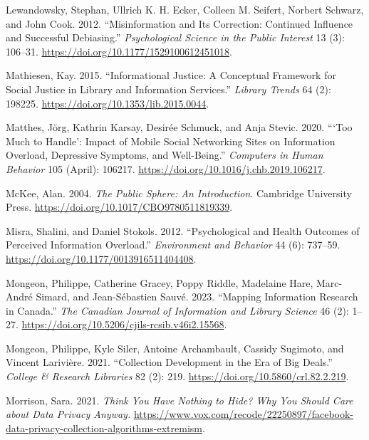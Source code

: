 \documentclass[
  letterpaper,
  DIV=11,
  numbers=noendperiod]{scrreprt}
\newlength{\cslhangindent}
\newenvironment{CSLReferences}[2] %
 {\begin{list}{}{%
  \setlength{\itemindent}{0pt}
  \setlength{\leftmargin}{0pt}
  \setlength{\parsep}{0pt}
  \ifodd #1
   \setlength{\leftmargin}{\cslhangindent}
   \setlength{\itemindent}{-1\cslhangindent}
  \fi
  \setlength{\itemsep}{#2\baselineskip}}}
 {\end{list}}
\begin{document}
\begin{CSLReferences}{1}{1}
Lewandowsky, Stephan, Ullrich K. H. Ecker, Colleen M. Seifert, Norbert
Schwarz, and John Cook. 2012. {``Misinformation and {Its} {Correction}:
{Continued} {Influence} and {Successful} {Debiasing}.''}
\emph{Psychological Science in the Public Interest} 13 (3): 106--31.
\url{https://doi.org/10.1177/1529100612451018}.

Mathiesen, Kay. 2015. {``Informational Justice: A Conceptual Framework
for Social Justice in Library and Information Services.''} \emph{Library
Trends} 64 (2): 198225. \url{https://doi.org/10.1353/lib.2015.0044}.

Matthes, Jörg, Kathrin Karsay, Desirée Schmuck, and Anja Stevic. 2020.
{``{`{Too} Much to Handle'}: {Impact} of Mobile Social Networking Sites
on Information Overload, Depressive Symptoms, and Well-Being.''}
\emph{Computers in Human Behavior} 105 (April): 106217.
\url{https://doi.org/10.1016/j.chb.2019.106217}.

McKee, Alan. 2004. \emph{The Public Sphere: An Introduction}. Cambridge
University Press. \url{https://doi.org/10.1017/CBO9780511819339}.

Misra, Shalini, and Daniel Stokols. 2012. {``Psychological and {Health}
{Outcomes} of {Perceived} {Information} {Overload}.''} \emph{Environment
and Behavior} 44 (6): 737--59.
\url{https://doi.org/10.1177/0013916511404408}.

Mongeon, Philippe, Catherine Gracey, Poppy Riddle, Madelaine Hare,
Marc-André Simard, and Jean-Sébastien Sauvé. 2023. {``Mapping
Information Research in Canada.''} \emph{The Canadian Journal of
Information and Library Science} 46 (2): 1--27.
\url{https://doi.org/10.5206/cjils-rcsib.v46i2.15568}.

Mongeon, Philippe, Kyle Siler, Antoine Archambault, Cassidy Sugimoto,
and Vincent Larivière. 2021. {``Collection Development in the Era of Big
Deals.''} \emph{College \& Research Libraries} 82 (2): 219.
\url{https://doi.org/10.5860/crl.82.2.219}.

Morrison, Sara. 2021. \emph{Think You Have Nothing to Hide? Why You
Should Care about Data Privacy Anyway.}
\url{https://www.vox.com/recode/22250897/facebook-data-privacy-collection-algorithms-extremism}.


\end{CSLReferences}
\end{document}
